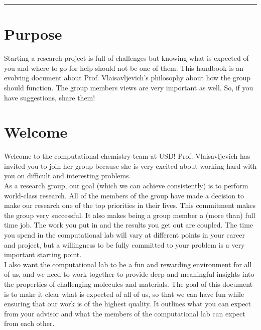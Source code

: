 \documentclass[letterpaper]{article}
\begin{document}

\noindent\rule{16.5cm}{1.5pt}

\section{Purpose}
Starting a research project is full of challenges but knowing what is expected of you and where to go for help should not be one of them. This handbook is an evolving document about Prof. Vlaisavljevich's philosophy about how the group should function. The group members views are very important as well. So, if you have suggestions, share them!

\section{Welcome}
Welcome to the computational chemistry team at USD!  Prof. Vlaisavljevich has invited you to join her group because she is very excited about working hard with you on difficult and interesting problems.\\

As a research group, our goal (which we can achieve consistently) is to perform world-class research. All of the members of the group have made a decision to make our research one of the top priorities in their lives. This commitment makes the group very successful. It also makes being a group member a (more than) full time job. The work you put in and the results you get out are coupled. The time you spend in the computational lab will vary at different points in your career and project, but a willingness to be fully committed to your problem is a very important starting point.\\

I also want the computational lab to be a fun and rewarding environment for all of us, and we need to work together to provide deep and meaningful insights into the properties of challenging molecules and materials. The goal of this document is to make it clear what is expected of all of us, so that we can have fun while ensuring that our work is of the highest quality. It outlines what you can expect from your advisor and what the members of the computational lab can expect from each other.\\
\end{document}
